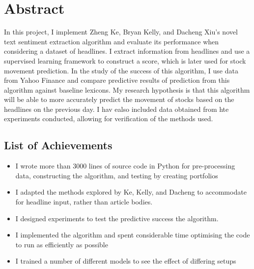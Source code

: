 \documentclass[ oneside,%
                    author={Joshua Felmeden},
                    degree={MEng},
                     title={Sentiment Analysis of Financial Headlines Based on Realised Stock Returns},
                  subtitle={Research}]{dissertation}
\begin{document}
\frontmatter





\chapter*{Abstract}


In this project, I implement Zheng Ke, Bryan Kelly, and Dacheng Xiu's novel text sentiment extraction algorithm and evaluate its performance when considering a dataset of headlines. I extract information from headlines and use a supervised learning framework to construct a score, which is later used for stock movement prediction. In the study of the success of this algorithm, I use data from Yahoo Finance and compare predictive results of prediction from this algorithm against baseline lexicons. My research hypothesis is that this algorithm will be able to more accurately predict the movement of stocks based on the headlines on the previous day. I hav ealso included data obtained from hte experiments conducted, allowing for verification of the methods used.

\section*{List of Achievements}
\begin{itemize}
      \item I wrote more than 3000 lines of source code in Python for pre-processing data, constructing the algorithm, and testing by creating portfolios
      \item I adapted the methods explored by Ke, Kelly, and Dacheng to accommodate for headline input, rather than article bodies.
      \item I designed experiments to test the predictive success the algorithm.
      \item I implemented the algorithm and spent considerable time optimising the code to run as efficiently as possible
      \item I trained a number of different models to see the effect of differing setups
\end{itemize}
\end{document}
